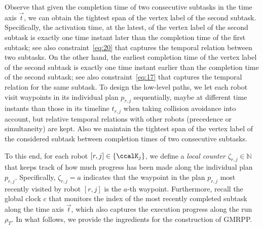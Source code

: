 \documentclass[Afour,sageh,times]{sagej}
\begin{document}
{ %

 {Observe that given the completion time of two consecutive subtasks in the time axis $\vec{t}$, we can obtain the tightest span of the vertex label of the second subtask. Specifically, the activation time, at the latest, of the vertex label of the second subtask is exactly one time instant later than the completion time of the first subtask; see also constraint~\eqref{eq:20} that captures the temporal relation between two subtasks. On the other hand, the earliest completion time of the vertex label of the second subtask is exactly one time instant earlier than the completion time of the second subtask; see also constraint~\eqref{eq:17} that captures the temporal relation for the same subtask.  To design the low-level paths,  we let each robot visit waypoints in its individual plan $p_{r,j}$ sequentially, maybe at different time instants than those in its timeline $t_{r,j}$ when taking collision avoidance into account, but relative temporal relations with other robots (precedence or simultaneity) are kept. Also we maintain the tightest span of the vertex label of the considered subtask between completion times of two consecutive subtasks.}

 To this end, for each robot $[r,j] \in \{\ccalK_j\}$, we define a {\it local counter} $\zeta_{r,j} \in \mathbb{N}$  that  keeps track of how much progress has been made along the individual plan $p_{r,j}$. Specifically, $\zeta_{r,j} = a$ indicates that the waypoint in the plan $p_{r,j}$ most recently visited by  robot $[r,j]$ is the $a$-th waypoint. Furthermore, recall the  global clock $c$ that monitors the index of the most recently completed subtask  along the time axis $\vec{t}$, which also captures the execution progress along the run $\rho_T$. In what follows, we provide the ingredients for the construction of GMRPP.

}
\end{document}
